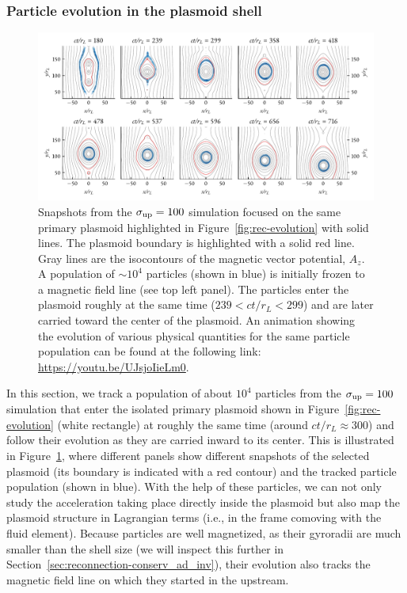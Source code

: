 \subsubsection{Particle evolution in the plasmoid shell}
\label{sec:part-evol}
\begin{figure}[htb]
    \includegraphics[width=\textwidth]{figures/ch2-reconnection/fig5.pdf}
    \caption{
        Snapshots from the $\sigma_{\rm up}=100$ simulation focused on the same primary plasmoid highlighted in Figure~\ref{fig:rec-evolution} with solid lines. The plasmoid boundary is highlighted with a solid red line. Gray lines are the isocontours of the magnetic vector potential, $A_z$. A population of $\sim 10^4$ particles (shown in blue) is initially frozen to a magnetic field line (see top left panel). The particles enter the plasmoid roughly at the same time ($239 < ct/r_L < 299$) and are later carried toward the center of the plasmoid. An animation showing the evolution of various physical quantities for the same particle population can be found at the following link: \url{https://youtu.be/UJsjoIieLm0}. 
    }
    \label{fig:rec-layerevol}
\end{figure}
In this section, we track a population of about $10^4$ particles from the $\sigma_{\rm up}=100$ simulation that enter the isolated primary plasmoid shown in Figure~\ref{fig:rec-evolution} (white rectangle) at roughly the same time (around $ct/r_L\approx 300$) and follow their evolution as they are carried inward to its center. This is illustrated in Figure~\ref{fig:rec-layerevol}, where different panels show different snapshots of the selected plasmoid (its boundary is indicated with a red contour) and the tracked particle population (shown in blue). With the help of these particles, we can not only study the acceleration taking place directly inside the plasmoid but also map the plasmoid structure in Lagrangian terms (i.e., in the frame comoving with the fluid element). Because particles are well magnetized, as their gyroradii are much smaller than the shell size (we will inspect this further in Section~\ref{sec:reconnection-conserv_ad_inv}), their evolution also tracks the magnetic field line on which they started in the upstream.

